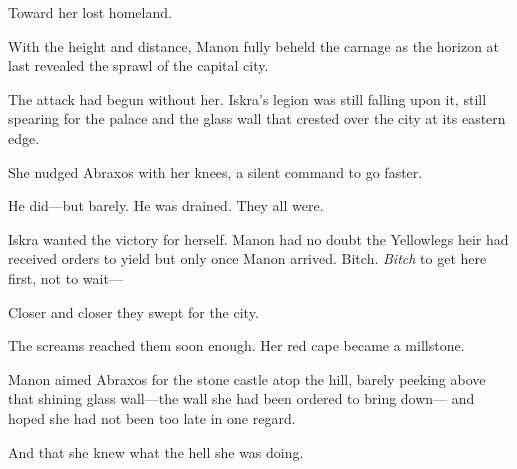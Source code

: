 Toward her lost homeland.

With the height and distance, Manon fully beheld the carnage as the horizon at last revealed the sprawl of the capital city.

The attack had begun without her. Iskra's legion was still falling upon it, still spearing for the palace and the glass wall that crested over the city at its eastern edge.

She nudged Abraxos with her knees, a silent command to go faster.

He did---but barely. He was drained. They all were.

Iskra wanted the victory for herself. Manon had no doubt the Yellowlegs heir had received orders to yield  but only once Manon arrived. Bitch. \emph{Bitch} to get here first, not to wait---

Closer and closer they swept for the city.

The screams reached them soon enough. Her red cape became a millstone.

Manon aimed Abraxos for the stone castle atop the hill, barely peeking above that shining glass wall---the wall she had been ordered to bring down--- and hoped she had not been too late in one regard.

And that she knew what the hell she was doing.
